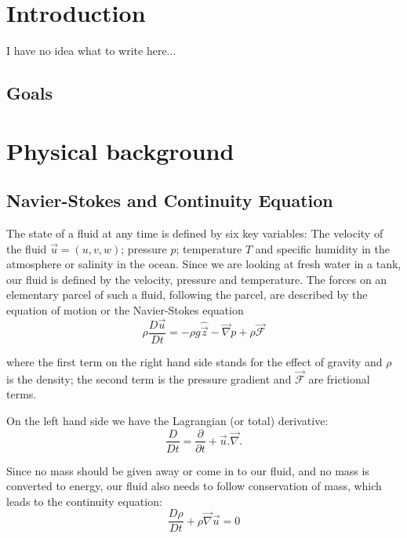 \documentclass[12pt, a4paper, twoside]{article}
\begin{document}
\section{Introduction}
	I have no idea what to write here...
	
	\subsection{Goals}
		

\newpage

\section{Physical background}

	\subsection{Navier-Stokes and Continuity Equation}
		
		The state of a fluid at any time is defined by six key variables:
		The velocity of the fluid $\vec{u}=(u,v,w)$; pressure $p$; temperature $T$ and specific humidity in the atmosphere or salinity in the ocean. Since we are looking at fresh water in a tank, our fluid is defined by the velocity, pressure and temperature. The forces on an elementary parcel of such a fluid, following the parcel, are described by the equation of motion	or the Navier-Stokes equation
		\begin{equation}
			\rho \frac{D\vec{u}}{Dt} = -\rho g \hat{\vec{z}} - \vec{\nabla} p + \rho \vec{\mathcal{F}}
			\label{eq:Simple NSG}
		\end{equation} 
		
		where the first term on the right hand side stands for the effect of gravity and $\rho$ is the density; the second term is the pressure gradient and $\vec{\mathcal{F}}$ are frictional terms.
		
		On the left hand side we have the Lagrangian (or total) derivative:
		\begin{equation}
			\frac{D}{Dt} = \frac{\partial}{\partial t} + \vec{u}.\vec{\nabla}.
			\label{eq:Lag Dev}
		\end{equation} 
		
		
		Since no mass should be given away or come in to our fluid, and no mass is converted to energy, our fluid also needs to follow conservation of mass, which leads to the continuity equation:
		\begin{equation}
			\frac{D\rho}{Dt} + \rho \vec{\nabla} \vec{u} = 0
			\label{eq:Continuity}
		\end{equation}
		
\end{document}
